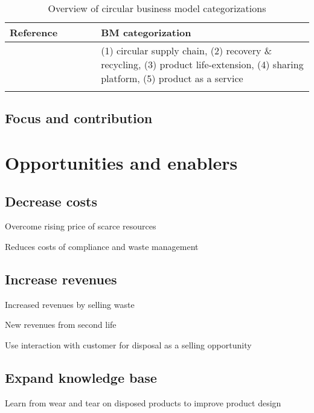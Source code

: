 \documentclass[a4paper,man,10pt]{apa6}
\begin{document}
\begin{table} \small \centering
\begin{tabular}{p{0.3 \linewidth}|p{0.7 \linewidth}}
Reference & BM categorization\\ \hline
     \cite{Lacy2015, Menkveld2018}& (1) circular supply chain, (2) recovery \& recycling, (3) product life-extension, (4) sharing platform, (5) product as a service \\
      &\\
     
     
\end{tabular}\caption{Overview of circular business model categorizations}\label{tab:BMcat}
\end{table}


\subsection{Focus and contribution}\label{subsec:focus}


\section{Opportunities and enablers}\label{sec:opportunities}
\subsection{Decrease costs} \label{subsec:DecreaseCosts}
Overcome rising price of scarce resources

Reduces costs of compliance and waste management

\subsection{Increase revenues}\label{subsec:IncreaseRevenues} 
Increased revenues by selling waste

New revenues from second life

Use interaction with customer for disposal as a selling opportunity

\subsection{Expand knowledge base}\label{subsec:Knowledge}
Learn from wear and tear on disposed products to improve product design
\end{document}
